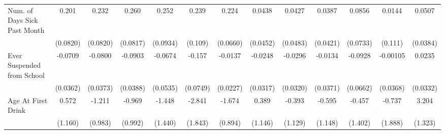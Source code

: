 {\begin{tabular}{l*{12}{c}}
\addlinespace
Num. of Days Sick Past Month&       0.201\sym{*}  &       0.232\sym{**} &       0.260\sym{**} &       0.252\sym{**} &       0.239\sym{*}  &       0.224\sym{***}&      0.0438         &      0.0427         &      0.0387         &      0.0856         &      0.0144         &      0.0507         \\
            &    (0.0820)         &    (0.0820)         &    (0.0817)         &    (0.0934)         &     (0.109)         &    (0.0660)         &    (0.0452)         &    (0.0483)         &    (0.0421)         &    (0.0733)         &     (0.111)         &    (0.0384)         \\
\addlinespace
Ever Suspended from School&     -0.0709\sym{*}  &     -0.0800\sym{*}  &     -0.0903\sym{*}  &     -0.0674         &      -0.157\sym{*}  &     -0.0137         &     -0.0248         &     -0.0296         &     -0.0134         &     -0.0928         &    -0.00105         &      0.0235         \\
            &    (0.0362)         &    (0.0373)         &    (0.0388)         &    (0.0535)         &    (0.0749)         &    (0.0227)         &    (0.0317)         &    (0.0320)         &    (0.0371)         &    (0.0662)         &    (0.0368)         &    (0.0332)         \\
\addlinespace
Age At First Drink&       0.572         &      -1.211         &      -0.969         &      -1.448         &      -2.841         &      -1.674         &       0.389         &      -0.393         &      -0.595         &      -0.457         &      -0.737         &       3.204\sym{*}  \\
            &     (1.160)         &     (0.983)         &     (0.992)         &     (1.440)         &     (1.843)         &     (0.894)         &     (1.146)         &     (1.129)         &     (1.148)         &     (1.402)         &     (1.888)         &     (1.323)         \\
\bottomrule
\end{tabular}
}
